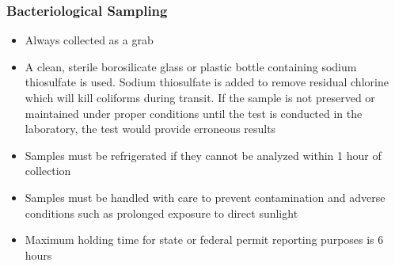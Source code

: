 \documentclass{article}
\begin{document}
\subsubsection{Bacteriological Sampling}
\begin{itemize}
\item Always collected as a grab
\item A clean, sterile borosilicate glass or plastic bottle containing sodium thiosulfate is used. Sodium thiosulfate is added to remove residual chlorine which will kill coliforms during transit. If the sample is not preserved or maintained under proper conditions until the test is conducted in the laboratory, the test would provide erroneous results
\item Samples must be refrigerated if they cannot be analyzed within 1 hour of collection
\item Samples must be handled with care to prevent contamination and adverse conditions such as prolonged exposure to direct sunlight
\item Maximum holding time for state or federal permit reporting purposes is 6 hours
\end{itemize} 
\end{document}

